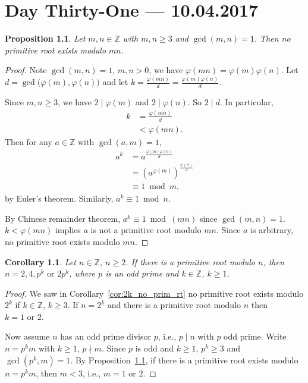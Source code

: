 \documentclass{amsbook}
\theoremstyle{plain}
\newtheorem{corollary}[theorem]{Corollary}
\newtheorem{proposition}[theorem]{Proposition}
\theoremstyle{definition}
\theoremstyle{remark}
\numberwithin{equation}{chapter}
\numberwithin{figure}{chapter}
\newcommand{\Z}{\mathbb{Z}}
\begin{document}
\chapter[Lecture Thirty-One]{Day Thirty-One \hfill {\footnotesize \rm --- 10.04.2017}}

\begin{proposition}\label{prop:mn_geq3_no_prim_rt}
  Let $m, n \in \Z$ with $m, n \geqslant 3$ and $\gcd (m, n) = 1$. Then no primitive root exists modulo $mn$.
\end{proposition}
\begin{proof}
  Note $\gcd (m, n) = 1$, $m, n > 0$, we have $\varphi (mn) = \varphi (m) \varphi (n)$. Let $d = \gcd \big(\varphi(m), \varphi(n) \big)$ and let $k = \frac{\varphi(mn)}d = \frac{\varphi(m)\varphi(n)}d$.

  Since $m, n \geqslant 3$, we have $2 \mid \varphi(m)$ and $2 \mid \varphi(n)$. So $2 \mid d$. In particular,
  \begin{align}
    k &= \frac{\varphi(mn)}d \\
      &< \varphi (mn).
  \end{align}
  Then for any $a \in \Z$ with $\gcd (a, m) = 1$,
  \begin{align}
    a^k &= a^{\frac{\varphi(m)\varphi(n)}d} \\
        &= \left( a^{\varphi(m)} \right)^{\frac{\varphi(n)}d} \\
        &\equiv 1 \bmod m,
  \end{align}
  by Euler's theorem. Similarly, $a^k \equiv 1 \bmod n$.

  By Chinese remainder theorem, $a^k \equiv 1 \bmod (mn)$ since $\gcd (m, n) = 1$. $k < \varphi(mn)$ implies $a$ is not a primitive root modulo $mn$. Since $a$ is arbitrary, no primitive root exists modulo $mn$.
\end{proof}
\begin{corollary}\label{cor:prim_rt_thm_easy_dir}
  Let $n \in \Z$, $n \geqslant 2$. If there is a primitive root modulo $n$, then $n = 2, 4, p^k \text { or } 2p^k$, where $p$ is an odd prime and $k \in \Z$, $k \geqslant 1$.
\end{corollary}
\begin{proof}
  We saw in Corollary~\ref{cor:2k_no_prim_rt} no primitive root exists modulo $2^k$ if $k \in \Z$, $k \geqslant 3$. If $n = 2^k$ and there is a primitive root modulo $n$ then $k = 1 \text{ or } 2$.

  Now assume $n$ has an odd prime divisor $p$, i.e., $p \mid n$ with $p$ odd prime. Write $n = p^km$ with $k \geqslant 1$, $p \nmid m$. Since $p$ is odd and $k \geqslant 1$, $p^k \geqslant 3$ and $\gcd (p^k, m) = 1$. By Proposition~\ref{prop:mn_geq3_no_prim_rt}, if there is a primitive root exists modulo $n = p^km$, then $m < 3$, i.e., $m = 1 \text { or } 2$.
\end{proof}
\end{document}
